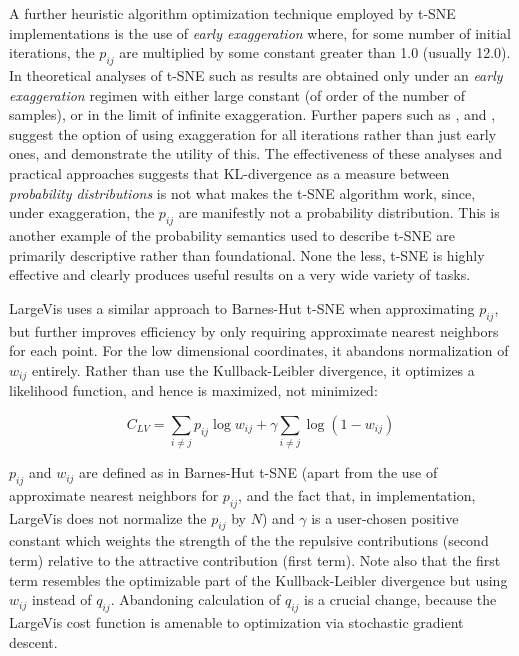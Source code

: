 \documentclass[12pt]{article}
\begin{document}
A further heuristic algorithm optimization technique employed by t-SNE implementations is the use of \emph{early exaggeration} where, for some number of initial iterations, the $p_{ij}$ are multiplied by some constant greater than 1.0 (usually 12.0). In theoretical analyses of t-SNE such as {\cite{linderman2019clustering}} results are obtained only under an \emph{early exaggeration} regimen with either large constant (of order of the number of samples), or in the limit of infinite exaggeration. Further papers such as {\cite{linderman2017efficient}}, and {\cite{kobak2019art}}, suggest the option of using exaggeration for all iterations rather than just early ones, and demonstrate the utility of this. The effectiveness of these analyses and practical approaches suggests that KL-divergence as a measure between \emph{probability distributions} is not what makes the t-SNE algorithm work, since, under exaggeration, the $p_{ij}$ are manifestly not a probability distribution. This is another example of the probability semantics used to describe t-SNE are primarily descriptive rather than foundational. None the less, t-SNE is highly effective and clearly produces useful results on a very wide variety of tasks.

LargeVis uses a similar approach to Barnes-Hut t-SNE when approximating $p_{ij}$, but further improves efficiency by only requiring approximate nearest neighbors for each point. For the low dimensional coordinates, it abandons normalization of $w_{ij}$ entirely. Rather than use the Kullback-Leibler divergence, it optimizes a likelihood function, and hence is maximized, not minimized:

\begin{equation}
    C_{LV} = \sum_{i \neq j} p_{ij} \log w_{ij} 
+\gamma \sum_{i \neq j} \log \left(1 - w_{ij} \right)
\end{equation}

$p_{ij}$ and $w_{ij}$ are defined as in Barnes-Hut t-SNE (apart from the use of approximate nearest neighbors for $p_{ij}$, and the fact that, in implementation, LargeVis does not normalize the $p_{ij}$ by $N$) and $\gamma$ is a user-chosen positive constant which weights the strength of the the repulsive contributions (second term) relative to the attractive contribution (first term). Note also that the first term resembles the optimizable part of the Kullback-Leibler divergence but using $w_{ij}$ instead of $q_{ij}$. Abandoning calculation of $q_{ij}$ is a crucial change, because the LargeVis cost function is amenable to optimization via stochastic gradient descent.
\end{document}
